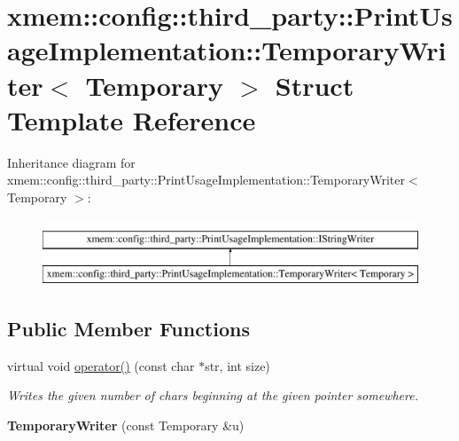 \hypertarget{structxmem_1_1config_1_1third__party_1_1_print_usage_implementation_1_1_temporary_writer}{\section{xmem\-:\-:config\-:\-:third\-\_\-party\-:\-:Print\-Usage\-Implementation\-:\-:Temporary\-Writer$<$ Temporary $>$ Struct Template Reference}
\label{structxmem_1_1config_1_1third__party_1_1_print_usage_implementation_1_1_temporary_writer}
}
Inheritance diagram for xmem\-:\-:config\-:\-:third\-\_\-party\-:\-:Print\-Usage\-Implementation\-:\-:Temporary\-Writer$<$ Temporary $>$\-:\begin{figure}[H]
\begin{center}
\leavevmode
\includegraphics[height=2.000000cm]{structxmem_1_1config_1_1third__party_1_1_print_usage_implementation_1_1_temporary_writer}
\end{center}
\end{figure}
\subsection*{Public Member Functions}
\begin{DoxyCompactItemize}
\item 
\hypertarget{structxmem_1_1config_1_1third__party_1_1_print_usage_implementation_1_1_temporary_writer_a0498e8ecbdacb8d62612ed353baef8a4}{virtual void \hyperlink{structxmem_1_1config_1_1third__party_1_1_print_usage_implementation_1_1_temporary_writer_a0498e8ecbdacb8d62612ed353baef8a4}{operator()} (const char $\ast$str, int size)}\label{structxmem_1_1config_1_1third__party_1_1_print_usage_implementation_1_1_temporary_writer_a0498e8ecbdacb8d62612ed353baef8a4}

\begin{DoxyCompactList}\small\item\em Writes the given number of chars beginning at the given pointer somewhere. \end{DoxyCompactList}\item 
\hypertarget{structxmem_1_1config_1_1third__party_1_1_print_usage_implementation_1_1_temporary_writer_a72507591866203f8f9fce1d565f24859}{{\bfseries Temporary\-Writer} (const Temporary \&u)}\label{structxmem_1_1config_1_1third__party_1_1_print_usage_implementation_1_1_temporary_writer_a72507591866203f8f9fce1d565f24859}

\end{DoxyCompactItemize}
